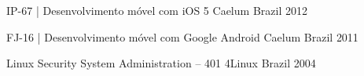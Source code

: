 

\begin{cventries}



  \cventry
    {IP-67 | Desenvolvimento móvel com iOS 5} %
    {Caelum} %
    {Brazil} %
    {2012} %
    {}



  \cventry
    {FJ-16 | Desenvolvimento móvel com Google Android} %
    {Caelum} %
    {Brazil} %
    {2011} %
    {
    }

  \cventry
    {Linux Security System Administration – 401} %
    {4Linux} %
    {Brazil} %
    {2004} %
    {}


\end{cventries}
